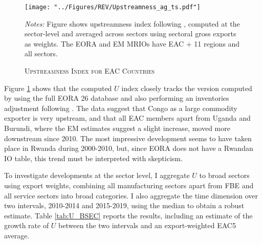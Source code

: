 \documentclass[a4paper]{article}
\begin{document}
\begin{figure}[h!]
\centering
\caption{\label{fig:EACUS_ag_ts}\textsc{Upstreamness Index for EAC Countries}}
\texttt{[image: "../Figures/REV/Upstreamness\_ag\_ts.pdf"]} \\ %
\raggedright
\scriptsize
\emph{Notes:} Figure shows upstreamness index following \citet{antras2012measuring}, computed at the sector-level and averaged across sectors using sectoral gross exports as weights. The EORA and EM MRIOs have EAC + 11 regions and all sectors.  
\vspace{4mm}
\end{figure}
\FloatBarrier



Figure \ref{fig:EACUS_ag_ts} shows that the computed $U$ index closely tracks the version computed by \citep{mancini2023positioning} using the full EORA 26 database and also performing an inventories adjustment following \citet{antras2018measurement}. The data suggest that Congo as a large commodity exporter is very upstream, and that all EAC members apart from Uganda and Burundi, where the EM estimates suggest a slight increase, moved more downstream since 2010. The most impressive development seems to have taken place in Rwanda during 2000-2010, but, since EORA does not have a Rwandan IO table, this trend must be interpreted with skepticism. \newline

To investigate developments at the sector level, I aggregate $U$ to broad sectors using export weights, combining all manufacturing sectors apart from FBE and all service sectors into broad categories. I also aggregate the time dimension over two intervals, 2010-2014 and 2015-2019, using the median to obtain a robust estimate. Table \ref{tab:U_BSEC} reports the results, including an estimate of the growth rate of $U$ between the two intervals and an export-weighted EAC5 average. \newline 
\end{document}

